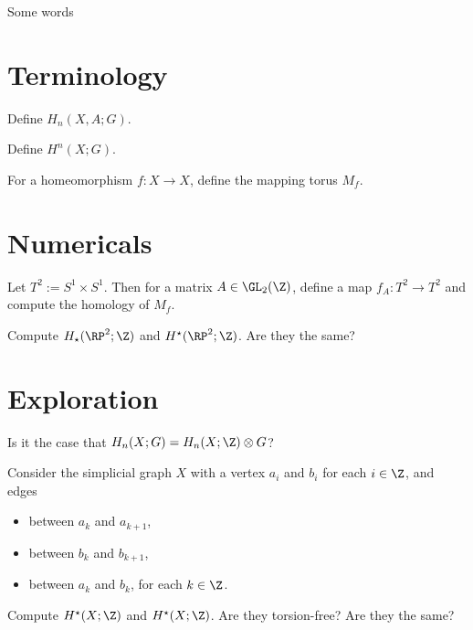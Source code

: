 \documentclass{homework}
\author{Jim Fowler}
\begin{document}
\maketitle

\begin{inspiration}
  Some words
\end{inspiration}

\section{Terminology}

\begin{problem}
  Define $H_n(X,A;G)$.
\end{problem}

\begin{problem}
 Define  
  $H^n(X;G)$.
\end{problem}

\begin{problem}
  For a homeomorphism $f : X \to X$, define the mapping torus $M_f$.
\end{problem}

\section{Numericals}

\begin{problem} Let $T^2 := S^1 \times S^1$.  Then for a matrix $A \in
\GL_2(\Z)$, define a map $f_A : T^2 \to T^2$ and compute the homology
of $M_f$.
\end{problem}

\begin{problem}
  Compute $H_\star(\RP^2;\Z)$ and $H^\star(\RP^2;\Z)$.  Are they the same?
\end{problem}

\section{Exploration}

\begin{problem}
  Is it the case that $H_n(X;G) = H_n(X;\Z) \otimes G$?
\end{problem}

\begin{problem}
  Consider the simplicial graph $X$ with a vertex $a_i$ and $b_i$ for each $i \in \Z$, and edges
  \begin{itemize}
  \item between $a_k$ and $a_{k+1}$,
  \item between $b_k$ and $b_{k+1}$,
  \item between $a_k$ and $b_k$, for each $k \in \Z$.
  \end{itemize} Compute $H^\star(X;\Z)$ and $H^\star(X;\Z)$.  Are they
torsion-free?  Are they the same?
\end{problem}
\end{document}
